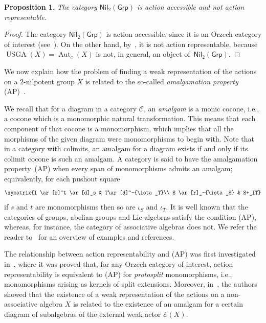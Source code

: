 \documentclass[reqno,hidelinks,a4paper]{amsart}
\theoremstyle{plain}
\newtheorem{proposition}[subsection]{Proposition}
\theoremstyle{definition}
\theoremstyle{remark}
\numberwithin{equation}{section}
\newcommand{\C}{\ensuremath{\mathcal{C}}}
\newcommand{\E}{\mathcal{E}}
\DeclareMathOperator{\Aut}{Aut}
\DeclareMathOperator{\USGA}{USGA}
\newcommand{\Grp}{\ensuremath{\mathsf{Grp}}}
\newcommand{\Nil}{\ensuremath{\mathsf{Nil}}}
\begin{document}
\begin{proposition}\label{thm_ar}
    The category \(\Nil_2(\Grp)\) is action accessible and not action representable.
\end{proposition}

\begin{proof}
    The category \(\Nil_2(\Grp)\) is action accessible, since it is an Orzech category of interest (see~\cite{Montoli}). On the other hand, by~\cite[Theorem 3.6]{Casas}, it is not action representable, because \(\USGA(X)=\Aut_c(X)\) is not, in general, an object of~\(\Nil_2(\Grp)\).
\end{proof}

We now explain how the problem of finding a weak representation of the actions on a \(2\)-nilpotent group \(X\) is related to the so-called \emph{amalgamation property} (AP)~\cite{kiss}.

We recall that for a diagram in a category \(\C\), an \emph{amalgam} is a monic cocone, i.e., a cocone which is a monomorphic natural transformation. This means that each component of that cocone is a monomorphism, which implies that all the morphisms of the given diagram were monomorphisms to begin with. Note that in a category with colimits, an amalgam for a diagram exists if and only if its colimit cocone is such an amalgam. A category is said to have the amalgamation property~(AP) when every span of monomorphisms admits an amalgam; equivalently, for each pushout square
\[
    \xymatrix{I \ar[r]^t \ar[d]_s & T\ar[d]^-{\iota_T}\\
    S \ar[r]_-{\iota_S} & S+_IT}
\]
if \(s\) and \(t\) are monomorphisms then so are \(\iota_S\) and \(\iota_T\). It is well known that the categories of groups, abelian groups and Lie algebras satisfy the condition (AP), whereas, for instance, the category of associative algebras does not. We refer the reader to~\cite{kiss} for an overview of examples and references.

The relationship between action representability and (AP) was first investigated in~\cite{BJK2}, where it was proved that, for any Orzech category of interest, action representability is equivalent to (AP) for \emph{protosplit} monomorphisms, i.e., monomorphisms arising as kernels of split extensions. Moreover, in~\cite{WRAAlg}, the authors showed that the existence of a weak representation of the actions on a non-associative algebra \(X\) is related to the existence of an amalgam for a certain diagram of subalgebras of the external weak actor \(\E(X)\).
\end{document}
